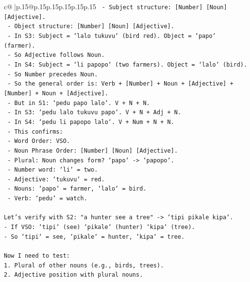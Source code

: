 \documentclass{article}
\begin{document}
{\begin{supertabular}{c@{$\;$}|p{.15\linewidth}@{}p{.15\linewidth}p{.15\linewidth}p{.15\linewidth}p{.15\linewidth}p{.15\linewidth}}
{{{\texttt{        {-} Subject structure: {[}Number{]} {[}Noun{]} {[}Adjective{]}.} \\
\texttt{        {-} Object structure: {[}Number{]} {[}Noun{]} {[}Adjective{]}.} \\
\texttt{        {-} In S3: Subject = `lalo tukuvu` (bird red). Object = `papo` (farmer).} \\
\texttt{        {-} So Adjective follows Noun.} \\
\texttt{        {-} In S4: Subject = `li papopo` (two farmers). Object = `lalo` (bird).} \\
\texttt{        {-} So Number precedes Noun.} \\
\texttt{        {-} So the general order is: Verb + {[}Number{]} + Noun + {[}Adjective{]} + {[}Number{]} + Noun + {[}Adjective{]}.} \\
\texttt{        {-} But in S1: `pedu papo lalo`. V + N + N.} \\
\texttt{        {-} In S3: `pedu lalo tukuvu papo`. V + N + Adj + N.} \\
\texttt{        {-} In S4: `pedu li papopo lalo`. V + Num + N + N.} \\
\texttt{        {-} This confirms:} \\
\texttt{          {-} Word Order: VSO.} \\
\texttt{          {-} Noun Phrase Order: {[}Number{]} {[}Noun{]} {[}Adjective{]}.} \\
\texttt{          {-} Plural: Noun changes form? `papo` {-}> `papopo`.} \\
\texttt{          {-} Number word: `li` = two.} \\
\texttt{          {-} Adjective: `tukuvu` = red.} \\
\texttt{          {-} Nouns: `papo` = farmer, `lalo` = bird.} \\
\texttt{          {-} Verb: `pedu` = watch.} \\
\\ 
\texttt{Let's verify with S2: "a hunter see a tree" {-}> `tipi pikale kipa`.} \\
\texttt{{-} If VSO: `tipi` (see) `pikale` (hunter) `kipa` (tree).} \\
\texttt{{-} So `tipi` = see, `pikale` = hunter, `kipa` = tree.} \\
\\ 
\texttt{Now I need to test:} \\
\texttt{1. Plural of other nouns (e.g., birds, trees).} \\
\texttt{2. Adjective position with plural nouns.} \\
}}}
\end{supertabular}}
\end{document}
